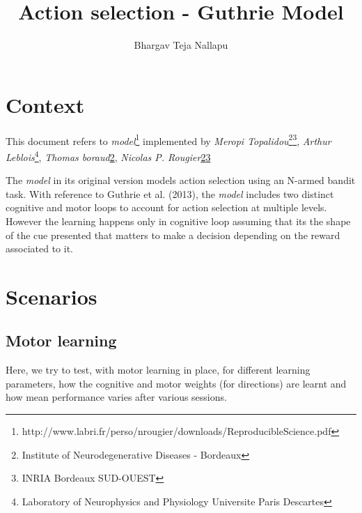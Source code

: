 \documentclass[11pt]{article}
\title{\textbf{Action selection - Guthrie Model}}
\author{Bhargav Teja Nallapu\\
		}
\date{}
\begin{document}
\maketitle

\section{Context}

This document refers to \emph{model}\footnote{http://www.labri.fr/perso/nrougier/downloads/ReproducibleScience.pdf} implemented by \emph{Meropi Topalidou}\footnote{\label{imn}Institute of Neurodegenerative Diseases - Bordeaux}\footnote{\label{inria}INRIA Bordeaux SUD-OUEST}, \emph{Arthur Leblois}\footnote{Laboratory of Neurophysics and Physiology Universite Paris Descartes}, \emph{Thomas boraud}\cref{imn}, \emph{Nicolas P. Rougier}\cref{imn}\cref{inria} 

The \emph{model} in its original version models action selection using an N-armed bandit task. With reference to Guthrie et al. (2013), the \emph{model} includes two distinct cognitive and motor loops to account for action selection at multiple levels. However the learning happens only in cognitive loop assuming that its the shape of the cue presented that matters to make a decision depending on the reward associated to it.

\section{Scenarios}
\subsection{Motor learning}
Here, we try to test, with motor learning in place, for different learning parameters, how the cognitive and motor weights (for directions) are learnt and how mean performance varies after various sessions.
\end{document}
